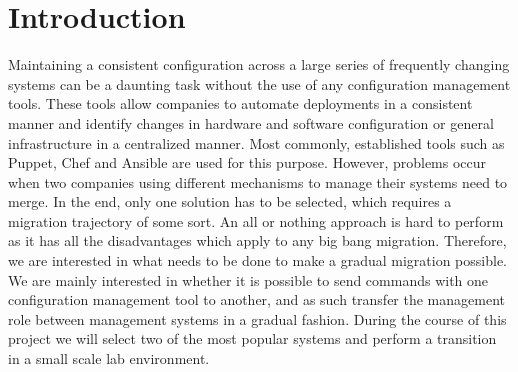\section{Introduction}\label{sec:introduction}
Maintaining a consistent configuration across a large series of frequently changing systems can be a daunting task without the use of any configuration management tools. These tools  allow companies to automate deployments in a consistent manner and identify changes in hardware and software configuration or general infrastructure in a centralized manner. Most commonly, established tools such as Puppet\cite{whatispuppet}, Chef \cite{whatischef} and Ansible\cite{whatisansible} are used for this purpose. However, problems occur when two companies using different mechanisms to manage their systems need to merge. In the end, only one solution has to be selected, which requires a migration trajectory of some sort. An all or nothing approach is hard to perform as it has all the disadvantages which apply to any big bang migration. Therefore, we are interested in what needs to be done to make a gradual migration possible. We are mainly interested in whether it is possible to send commands with one configuration management tool to another, and as such transfer the management role between management systems in a gradual fashion. During the course of this project we will select two of the most popular systems and perform a transition in a small scale lab environment.
  
